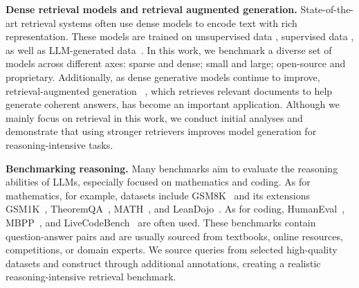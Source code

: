 \textbf{Dense retrieval models and retrieval augmented generation.} State-of-the-art retrieval systems often use dense models to encode text with rich representation. 
These models are trained on unsupervised data \citep{lee-etal-2019-latent,izacard2022unsupervised}, supervised data \citep{su-etal-2023-one,asai-etal-2023-task,muennighoff2022sgpt}, as well as LLM-generated data~\citep{lee2024gecko,wang2023improving,muennighoff2024generative}. 
In this work, we benchmark a diverse set of models across different axes: sparse and dense; small and large; open-source and proprietary. 
Additionally, as dense generative models continue to improve, retrieval-augmented generation ~\citep[RAG;][]{asai2020reliable, borgeaud2022retro, asai2023self, muennighoff2024generative,asai2024reliable,gao2023enabling,shi2024replug}, which retrieves relevant documents to help generate coherent answers, has become an important application. 
Although we mainly focus on retrieval in this work, we conduct initial analyses and demonstrate that using stronger retrievers improves model generation for reasoning-intensive tasks.

\textbf{Benchmarking reasoning.} 
Many benchmarks aim to evaluate the reasoning abilities of LLMs, especially focused on mathematics and coding. As for mathematics, for example, datasets include GSM8K~\citep{cobbe2021training} and its extensions GSM1K~\citep{zhang2024careful}, TheoremQA~\citep{chen-etal-2023-theoremqa}, MATH~\citep{hendrycks2021measuring}, and LeanDojo~\citep{yang2023leandojo}. 
As for coding, %
HumanEval~\citep{chen2021evaluating}, MBPP~\citep{austin2021program}, and LiveCodeBench~\citep{jain2024livecodebench} are often used. 
These benchmarks contain question-answer pairs and are usually sourced from textbooks, online resources, competitions, or domain experts. 
We source queries from selected high-quality datasets and construct \ours{} through additional annotations, creating a realistic reasoning-intensive retrieval benchmark.
